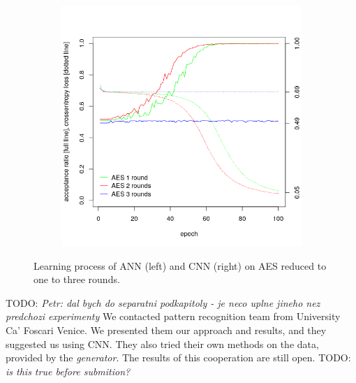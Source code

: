 \documentclass[
  print, %
  Table,   %
  nolof,     %
  nolot,     %
  11pt, %
  oneside  %
]{fithesis3}
\newcommand{\todo}[1]{TODO: \textit{#1}}
\begin{document}
\begin{figure}[H]
\begin{changemargin}{-3cm}{-3cm}
\begin{subfigure}{.6\textwidth}
  \includegraphics[width=.98\textwidth]{./graphics/ann/cnn.png}
  \label{fig:ann-learning-cnn}
\end{subfigure}
\end{changemargin}
\caption{Learning process of ANN (left) and CNN (right) on AES reduced to one to three rounds.}
\label{fig:ann-learning}
\end{figure}

\todo{Petr: dal bych do separatni podkapitoly - je neco uplne jineho nez predchozi experimenty}
We contacted pattern recognition team from University Ca’ Foscari Venice. We presented them our approach and results, and they suggested us using CNN. They also tried their own methods on the data, provided by the \textit{generator}. The results of this cooperation are still open. \todo{is this true before submition?}



\end{document}
